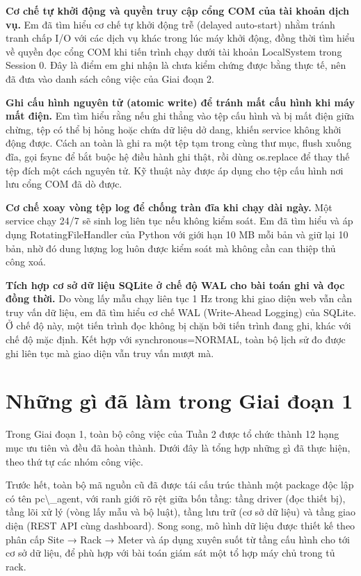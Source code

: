 \documentclass[12pt,a4paper]{article}
\begin{document}
\noindent\textbf{Cơ chế tự khởi động và quyền truy cập cổng COM của tài khoản dịch vụ.} Em đã tìm hiểu cơ chế tự khởi động trễ (delayed auto-start) nhằm tránh tranh chấp I/O với các dịch vụ khác trong lúc máy khởi động, đồng thời tìm hiểu về quyền đọc cổng COM khi tiến trình chạy dưới tài khoản LocalSystem trong Session 0. Đây là điểm em ghi nhận là chưa kiểm chứng được bằng thực tế, nên đã đưa vào danh sách công việc của Giai đoạn 2.\par
\noindent\textbf{Ghi cấu hình nguyên tử (atomic write) để tránh mất cấu hình khi máy mất điện.} Em tìm hiểu rằng nếu ghi thẳng vào tệp cấu hình và bị mất điện giữa chừng, tệp có thể bị hỏng hoặc chứa dữ liệu dở dang, khiến service không khởi động được. Cách an toàn là ghi ra một tệp tạm trong cùng thư mục, flush xuống đĩa, gọi fsync để bắt buộc hệ điều hành ghi thật, rồi dùng os.replace để thay thế tệp đích một cách nguyên tử. Kỹ thuật này được áp dụng cho tệp cấu hình nơi lưu cổng COM đã dò được.\par
\noindent\textbf{Cơ chế xoay vòng tệp log để chống tràn đĩa khi chạy dài ngày.} Một service chạy 24/7 sẽ sinh log liên tục nếu không kiểm soát. Em đã tìm hiểu và áp dụng RotatingFileHandler của Python với giới hạn 10 MB mỗi bản và giữ lại 10 bản, nhờ đó dung lượng log luôn được kiểm soát mà không cần can thiệp thủ công xoá.\par
\noindent\textbf{Tích hợp cơ sở dữ liệu SQLite ở chế độ WAL cho bài toán ghi và đọc đồng thời.} Do vòng lấy mẫu chạy liên tục 1 Hz trong khi giao diện web vẫn cần truy vấn dữ liệu, em đã tìm hiểu cơ chế WAL (Write-Ahead Logging) của SQLite. Ở chế độ này, một tiến trình đọc không bị chặn bởi tiến trình đang ghi, khác với chế độ mặc định. Kết hợp với synchronous=NORMAL, toàn bộ lịch sử đo được ghi liên tục mà giao diện vẫn truy vấn mượt mà.\par
\section{Những gì đã làm trong Giai đoạn 1}
Trong Giai đoạn 1, toàn bộ công việc của Tuần 2 được tổ chức thành 12 hạng mục ưu tiên và đều đã hoàn thành. Dưới đây là tổng hợp những gì đã thực hiện, theo thứ tự các nhóm công việc.

Trước hết, toàn bộ mã nguồn cũ đã được tái cấu trúc thành một package độc lập có tên pc\textbackslash{}\_agent, với ranh giới rõ rệt giữa bốn tầng: tầng driver (đọc thiết bị), tầng lõi xử lý (vòng lấy mẫu và bộ luật), tầng lưu trữ (cơ sở dữ liệu) và tầng giao diện (REST API cùng dashboard). Song song, mô hình dữ liệu được thiết kế theo phân cấp Site → Rack → Meter và áp dụng xuyên suốt từ tầng cấu hình cho tới cơ sở dữ liệu, để phù hợp với bài toán giám sát một tổ hợp máy chủ trong tủ rack.
\end{document}

